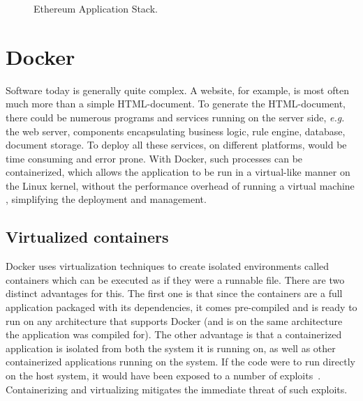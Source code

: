 \begin{figure}[ht]
\centering
{}
\caption{Ethereum Application Stack.}
\label{fig:tech:stack}
\end{figure}

\section{Docker}
Software today is generally quite complex. A website, for example, is most often much more than a simple HTML-document. To generate the HTML-document, there could be numerous programs and services running on the server side, \textit{e.g.} the web server, components encapsulating business logic, rule engine, database, document storage. To deploy all these services, on different platforms, would be time consuming and error prone. With Docker, such processes can be containerized, which allows the application to be run in a virtual-like manner on the Linux kernel, without the performance overhead of running a virtual machine \cite{docker-about}, simplifying the deployment and management.

\subsection{Virtualized containers}
Docker uses virtualization techniques to create isolated environments called containers which can be executed as if they were a runnable file. There are two distinct advantages for this. The first one is that since the containers are a full application packaged with its dependencies, it comes pre-compiled and is ready to run on any architecture that supports Docker (and is on the same architecture the application was compiled for). The other advantage is that a containerized application is isolated from both the system it is running on, as well as other containerized applications running on the system. If the code were to run directly on the host system, it would have been exposed to a number of exploits~\cite{korpela:2012}. Containerizing and virtualizing mitigates the immediate threat of such exploits.

